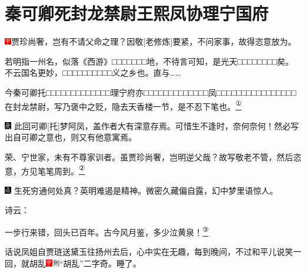 

\chapter{秦可卿死封龙禁尉\hspace{.5em}王熙凤协理宁国府}

\includegraphics[width=3mm]{../Images/00002}{贾珍尚奢，岂有不请父命之理？因敬{[}老修炼{]}要紧，不问家事，故得恣意放为。}

{若明指一州名，似落《西游》□□□□□□□地，不待言可知，是光天□□□□□□□□矣。不云国名更妙，□□□□□□□□□□义之乡也。直与\ldots{}\ldots{}}

{今秦可卿托□□□□□□□□□□□□□理宁府亦□□□□□□□□□□□□□凤□□□□□□□□□□□□□□□□在封龙禁尉，写乃褒中之贬，隐去天香楼一节，是不忍下笔也。}\href{../Text/part0017_split_000.html\#lnkback_1_a}{\textsuperscript{①}}

{{\includegraphics[width=3mm]{../Images/00004}  \kaishu 此回可卿{[}托{]}梦阿凤，盖作者大有深意存焉。可惜生不逢时，奈何奈何！然必写出自可卿之意也，则又有他意寓焉。}}

{{荣、宁世家，未有不尊家训者。虽贾珍尚奢，岂明逆父哉？故写敬老不管，然后恣意，方见笔笔周到。}}\href{../Text/part0017_split_000.html\#lnkback_2_a}{\textsuperscript{②}}

{\includegraphics[width=3mm]{../Images/00005} \kaishu 生死穷通何处真？英明难遏是精神。微密久藏偏自露，幻中梦里语惊人。}

诗云：

一步行来错，回头已百年。古今风月鉴，多少泣黄泉！\href{../Text/part0017_split_000.html\#lnkback_3_a}{\textsuperscript{③}}

话说凤姐自贾琏送黛玉往扬州去后，心中实在无趣，每到晚间，不过和平儿说笑一回，就胡乱{\includegraphics[width=3mm]{../Images/00002}\includegraphics[width=3mm]{../Images/00011}\footnotesize \kaishu ``胡乱''二字奇。}睡了。

